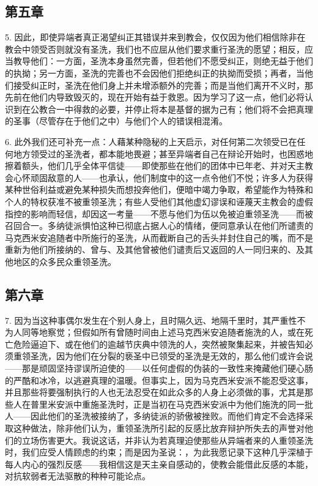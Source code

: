 
\subsection{第五章}

5. 因此，即使异端者真正渴望纠正其错误并来到教会，仅仅因为他们相信除非在教会中领受否则就没有圣洗，我们也不应屈从他们要求重行圣洗的愿望；相反，应当教导他们：一方面，圣洗本身虽然完善，但若他们不愿受纠正，则绝无益于他们的执拗；另一方面，圣洗的完善也不会因他们拒绝纠正的执拗而受损；再者，当他们接受纠正时，圣洗在他们身上并未增添额外的完善；而是当他们离开不义时，那先前在他们内导致毁灭的，现在开始有益于救恩。因为学习了这一点，他们必将认识到在公教合一中得救的必要，并停止将本是基督的据为己有；他们将不会把真理的圣事（尽管存在于他们之中）与他们个人的错误相混淆。\par

6. 此外我们还可补充一点：人藉某种隐秘的上天启示，对任何第二次领受已在任何地方领受过的圣洗者，都本能地畏避；甚至异端者自己在辩论开始时，也困惑地擦着额头，他们几乎全体平信徒——即使那些在他们的团体中已年老、并对天主教会心怀顽固敌意的人——也承认，他们制度中的这一点令他们不悦；许多人为获得某种世俗利益或避免某种损失而想投奔他们，便暗中竭力争取，希望能作为特殊和个人的特权获准不被重领圣洗；有些人受他们其他虚幻谬误和诬蔑天主教会的虚假指控的影响而轻信，却因这一考量——不愿与他们为伍以免被迫重领圣洗——而被召回合一。多纳徒派惧怕这种已彻底占据人心的情绪，便同意承认在他们所谴责的马克西米安追随者中所施行的圣洗，从而截断自己的舌头并封住自己的嘴，而不是重新为他们所接纳的、曾与、及其他曾被他们谴责后又返回的人一同归来的、及其他地区的众多民众重领圣洗。\par


\subsection{第六章}

7. 因为当这种事偶尔发生在个别人身上，且时隔久远、地隔千里时，其严重性不为人同等地察觉；但假如所有曾随时间由上述马克西米安追随者施洗的人，或在死亡危险逼迫下、或在他们的逾越节庆典中领洗的人，突然被聚集起来，并被告知必须重领圣洗，因为他们在分裂的亵圣中已领受的圣洗是无效的，那么他们或许会说——那是顽固坚持谬误所迫使的——以任何虚假的伪装的一致性来掩藏他们硬心肠的严酷和冰冷，以逃避真理的温暖。但事实上，因为马克西米安派不能忍受这事，并且那些将要强制执行的人也无法忍受在如此众多的人身上必须做的事，尤其是那些人在普里米安派中重施圣洗时，正是当初在马克西米安派中为他们施洗的同一批人——因此他们的圣洗被接纳了，多纳徒派的骄傲被挫败。而他们肯定不会选择采取这种做法，除非他们认为，重领圣洗所引起的反感比放弃辩护所失去的声誉对他们的立场伤害更大。我说这话，并非认为若真理迫使那些从异端者来的人重领圣洗时，我们应受人情顾虑的约束；而是因为圣说：，为此我愿记录下这种几乎深植于每人内心的强烈反感——我相信这是天主亲自感动的，使教会能借此反感的本能，对抗软弱者无法驱散的种种可能论点。\par

